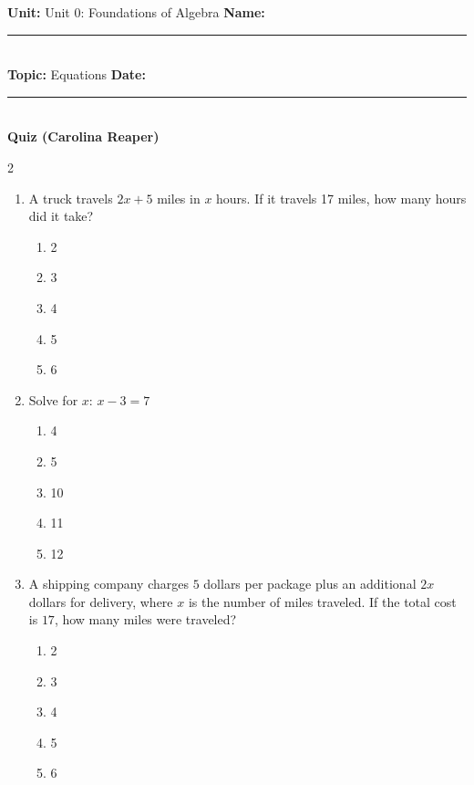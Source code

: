 \documentclass[10pt]{article}
\begin{document}
\enlargethispage{2.5cm}

\begin{tcolorbox}[colback=mainblue!5, colframe=mainblue, sharp corners, boxrule=0.5pt]
    \small \textbf{Unit:} Unit 0: Foundations of Algebra \hfill \textbf{Name:} \rule{3cm}{0.4pt} \\
    \small \textbf{Topic:} Equations \hfill \textbf{Date:} \rule{2cm}{0.4pt} \\
    \centering \textbf{\large Quiz (Carolina Reaper)}
\end{tcolorbox}

\vspace{0.2cm}

\begin{multicols}{2}
\begin{enumerate}[label=\textbf{Q\arabic*.}, leftmargin=*, itemsep=6pt, parsep=0pt]

  \item \small A truck travels $2x + 5$ miles in $x$ hours. If it travels 17 miles, how many hours did it take?
  \begin{enumerate}[label=(\Alph*), leftmargin=0.6cm, nosep, itemsep=2pt]
    \item 2
    \item 3
    \item 4
    \item 5
    \item 6
  \end{enumerate}

  \item \small Solve for $x$: $x - 3 = 7$
  \begin{enumerate}[label=(\Alph*), leftmargin=0.6cm, nosep, itemsep=2pt]
    \item 4
    \item 5
    \item 10
    \item 11
    \item 12
  \end{enumerate}

  \item \small A shipping company charges $5$ dollars per package plus an additional $2x$ dollars for delivery, where $x$ is the number of miles traveled. If the total cost is $17$, how many miles were traveled?
  \begin{enumerate}[label=(\Alph*), leftmargin=0.6cm, nosep, itemsep=2pt]
    \item 2
    \item 3
    \item 4
    \item 5
    \item 6
  \end{enumerate}


\end{enumerate}
\end{multicols}
\end{document}
